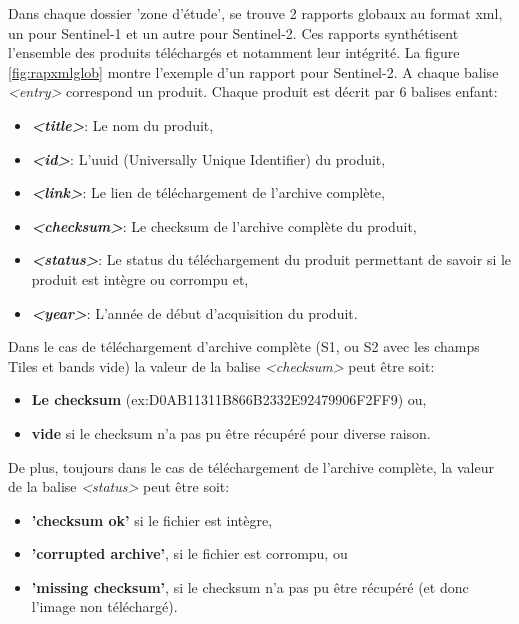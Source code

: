 \documentclass[notitlepage]{report}
\begin{document}
Dans chaque dossier 'zone d'étude', se trouve 2 rapports globaux au format xml, un pour Sentinel-1 et un autre pour Sentinel-2. Ces rapports synthétisent l’ensemble des produits téléchargés et notamment leur intégrité. La figure \ref{fig:rapxmlglob} montre l'exemple d'un rapport pour Sentinel-2. A chaque balise \emph{<entry>} correspond un produit. Chaque produit est décrit par 6 balises enfant:
\begin{itemize}
\item \textbf{\emph{<title>}}: Le nom du produit,
\item \textbf{\emph{<id>}}: L'uuid (Universally Unique Identifier) du produit,
\item \textbf{\emph{<link>}}: Le lien de téléchargement de l'archive complète,
\item \textbf{\emph{<checksum>}}: Le checksum de l'archive complète du produit,
\item \textbf{\emph{<status>}}: Le status du téléchargement du produit permettant de savoir si le produit est intègre ou corrompu et,
\item \textbf{\emph{<year>}}: L'année de début d'acquisition du produit.
\end{itemize}
\bigskip

Dans le cas de téléchargement d'archive complète (S1, ou S2 avec les champs Tiles et bands vide) la valeur de la balise \emph{<checksum>} peut être soit:
\begin{itemize}
\item \textbf{Le checksum} (ex:D0AB11311B866B2332E92479906F2FF9) ou,
\item \textbf{vide} si le checksum n'a pas pu être récupéré pour diverse raison.
\end{itemize}
\bigskip

De plus, toujours dans le cas de téléchargement de l'archive complète, la valeur de la balise \emph{<status>} peut être soit:
\begin{itemize}
\item \textbf{'checksum ok'} si le fichier est intègre,
\item \textbf{'corrupted archive'}, si le fichier est corrompu, ou
\item \textbf{'missing checksum'}, si le checksum n'a pas pu être récupéré (et donc l'image non téléchargé).
\end{itemize}
\bigskip
\end{document}
